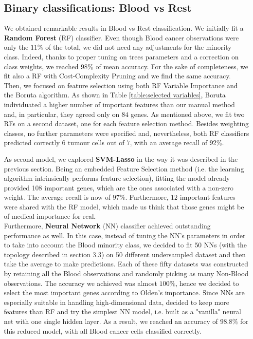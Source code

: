 \documentclass[a4paper,11pt, oneside]{article}  %
\begin{document}
	\subsection{Binary classifications: Blood vs Rest}
We obtained remarkable results in Blood vs Rest classification.  We initially fit a \textbf{Random Forest} (RF) classifier.  Even though Blood cancer observations were only the $11\%$ of the total,  we did not need any adjustments for the minority class.  Indeed,  thanks to proper tuning on trees parameters and a correction on class weights, we reached $98\%$ of mean accuracy.  For the sake of completeness,  we fit also a RF with Cost-Complexity Pruning and we find the same accuracy.  Then,  we focused on feature selection using both RF Variable Importance and the Boruta algorithm.  As shown in Table \ref{table:selected variables},  Boruta individuated a higher number of important features than our manual method and,  in particular,  they agreed only on $84$ genes.  As mentioned above,  we fit two RFs on a second dataset,  one for each feature selection method.  Besides weighting classes,  no further parameters were specified and,  nevertheless,  both RF classifiers predicted correctly $6$ tumour cells out of $7$,  with an average recall of $92 \%$.
	
As second model,  we explored \textbf{SVM-Lasso} in the way it was described in the previous section.  Being an 
embedded Feature Selection method (i.e.  the learning algorithm intrinsically performs feature selection),  fitting the model already provided 108 important genes,  which are the ones associated with a non-zero weight.  The average recall is now of $97\%$.  Furthermore,  $12$ important features were shared with the RF model,  which made us think that those genes might be of medical importance for real.\\

Furthermore,  \textbf{Neural Network} (NN) classifier achieved outstanding performance as well.  In this case,  instead of tuning the NN's parameters in order to take into account the Blood minority class,  we decided to fit 50 NNs (with the topology described in section 3.3)  on 50 different undersampled dataset and then take the average to make predictions.   Each of these fifty datasets was constructed by retaining all the Blood observations and randomly picking as many Non-Blood observations.  The accuracy we achieved was almost $100\%$,  hence we decided to  select the most important genes according to Olden's importance.  Since NNs are especially suitable in handling high-dimensional data, decided to keep more features than RF and try the simplest NN model,  i.e.  built as a "vanilla" neural net with one single hidden layer.  As a result,  we reached an accuracy of $98.8\%$ for this reduced model,  with all Blood cancer cells classified correctly. 
	
\end{document}
